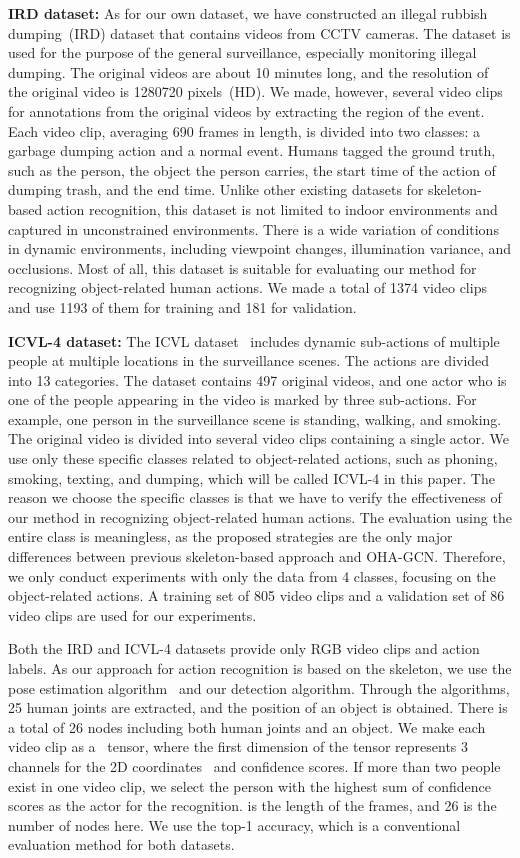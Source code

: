 \documentclass[10pt,twocolumn,letterpaper]{article}
\begin{document}
\textbf{IRD dataset:} 
As for our own dataset, we have constructed an illegal rubbish dumping~(IRD) dataset that contains videos from CCTV cameras.
The dataset is used for the purpose of the general surveillance, especially monitoring illegal dumping.
The original videos are about 10 minutes long, and the resolution of the original video is 1280720 pixels~(HD).
We made, however, several video clips for annotations from the original videos by extracting the region of the event.
Each video clip, averaging 690 frames in length, is divided into two classes:  a garbage dumping action and  a normal event.
Humans tagged the ground truth, such as the person, the object the person carries, the start time of the action of dumping trash, and the end time.
Unlike other existing datasets for skeleton-based action recognition, this dataset is not limited to indoor environments and captured in unconstrained environments.
There is a wide variation of conditions in dynamic environments, including viewpoint changes, illumination variance, and occlusions.
Most of all, this dataset is suitable for evaluating our method for recognizing object-related human actions.
We made a total of 1374 video clips and use 1193 of them for training and 181 for validation.

\textbf{ICVL-4 dataset:} 
The ICVL dataset~\cite{Jin:2018hda} includes dynamic sub-actions of multiple people at multiple locations in the surveillance scenes.
The actions are divided into 13 categories. 
The dataset contains 497 original videos, and one actor who is one of the people appearing in the video is marked by three sub-actions. 
For example, one person in the surveillance scene is standing, walking, and smoking.
The original video is divided into several video clips containing a single actor.
We use only these specific classes related to object-related actions, such as phoning, smoking, texting, and dumping, which will be called ICVL-4 in this paper.
The reason we choose the specific classes is that we have to verify the effectiveness of our method in recognizing object-related human actions. 
The evaluation using the entire class is meaningless, as the proposed strategies are the only major differences between previous skeleton-based approach and OHA-GCN.
Therefore, we only conduct experiments with only the data from 4 classes, focusing on the object-related actions.
A training set of 805 video clips and a validation set of 86 video clips are used for our experiments.


Both the IRD and ICVL-4 datasets provide only RGB video clips and action labels.
As our approach for action recognition is based on the skeleton, we use the pose estimation algorithm~\cite{cao2017realtime} and our detection algorithm.
Through the algorithms, 25 human joints are extracted, and the position of an object is obtained. There is a total of 26 nodes including both human joints and an object.
We make each video clip as a~ tensor, where the first dimension of the tensor represents 3 channels for the 2D coordinates~ and confidence scores.
If more than two people exist in one video clip, we select the person with the highest sum of confidence scores as the actor for the recognition.
 is the length of the frames, and 26 is the number of nodes here.
We use the top-1 accuracy, which is a conventional evaluation method for both datasets.
\end{document}
